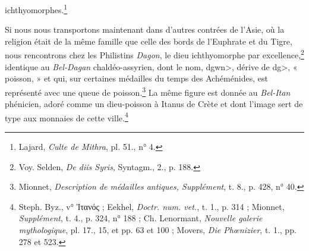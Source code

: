 \documentclass[a4paper, 11pt, oneside, landscape]{article}
\begin{document}
ichthyomorphes.\footnote{Lajard, \emph{Culte de Mithra}, pl. 51., n° 4.}

Si nous nous transportons maintenant dans d'autres contrées de l'Asie, où la religion était de la même famille que celle des bords de l'Euphrate et du Tigre, nous rencontrons chez les Philistins \emph{Dagon}, le dieu ichthyomorphe par excellence,\footnote{Voy. Selden, \emph{De diis Syris}, Syntagm., 2., p. 188.} identique au \emph{Bel-Dagan} chaldéo-assyrien, dont le nom, \<dgwn>, dérive de \<dg>, « poisson, » et qui, sur certaines médailles du temps des Achéménides, est représenté avec une queue de poisson.\footnote{Mionnet, \emph{Description de médailles antiques, Supplément}, t. 8., p. 428, n° 40.} La même figure est donnée au \emph{Bel-Itan} phénicien, adoré comme un dieu-poisson à Itanus de Crète et dont l'image sert de type aux monnaies de cette ville.\footnote{Steph. Byz., v° Ἰτανός ; Eekhel, \emph{Doctr. num. vet.}, t. 1., p. 314 ; Mionnet, \emph{Supplément}, t. 4., p. 324, n° 188 ; Ch. Lenormant, \emph{Nouvelle galerie mythologique}, pl. 17., 15, et pp. 63 et 100 ; Movers, \emph{Die Phœnizier}, t. 1., pp. 278 et 523.}
\end{document}
